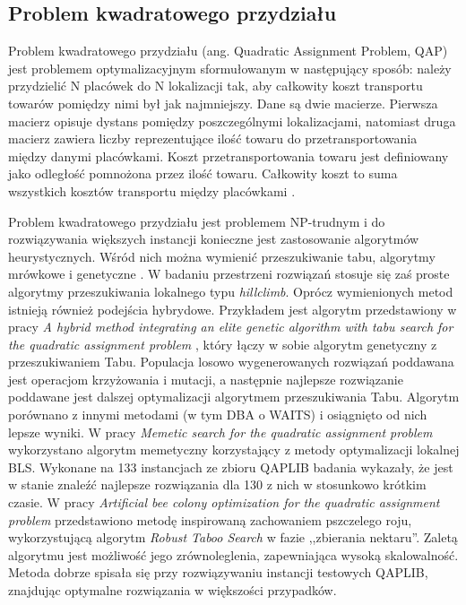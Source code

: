 \subsection{Problem kwadratowego przydziału}
Problem kwadratowego przydziału (ang. Quadratic Assignment Problem, QAP) jest problemem optymalizacyjnym sformułowanym w następujący sposób:
należy przydzielić N placówek do N lokalizacji tak, aby całkowity koszt transportu towarów pomiędzy nimi był jak najmniejszy.
Dane są dwie macierze. Pierwsza macierz opisuje dystans pomiędzy poszczególnymi lokalizacjami, natomiast druga macierz
zawiera liczby reprezentujące ilość towaru do przetransportowania między danymi placówkami.
Koszt przetransportowania towaru jest definiowany jako odległość pomnożona przez ilość towaru.
Całkowity koszt to suma wszystkich kosztów transportu między placówkami \cite{doi:10.1287/mnsc.9.4.586}.

Problem kwadratowego przydziału jest problemem NP-trudnym i do rozwiązywania większych instancji konieczne jest zastosowanie algorytmów
heurystycznych. Wśród nich można wymienić przeszukiwanie tabu, algorytmy mrówkowe i genetyczne \cite{DBLP:journals/concurrency/AcharyPPMGE21}.
W badaniu przestrzeni rozwiązań stosuje się zaś proste algorytmy przeszukiwania lokalnego typu \textit{hillclimb}.
Oprócz wymienionych metod istnieją również podejścia hybrydowe.
Przykładem jest algorytm przedstawiony w pracy \textit{A hybrid method integrating an elite genetic algorithm with tabu search for the quadratic assignment problem} \cite{DBLP:journals/isci/ZhangLZZ20},
który łączy w sobie algorytm genetyczny z przeszukiwaniem Tabu. Populacja losowo wygenerowanych rozwiązań
poddawana jest operacjom krzyżowania i mutacji, a następnie najlepsze rozwiązanie poddawane jest dalszej optymalizacji algorytmem przeszukiwania Tabu.
Algorytm porównano z innymi metodami (w tym DBA o WAITS) i osiągnięto od nich lepsze wyniki.
W pracy \textit{Memetic search for the quadratic assignment problem} \cite{DBLP:journals/eswa/BenlicH15} wykorzystano algorytm memetyczny korzystający z metody optymalizacji lokalnej
BLS. Wykonane na 133 instancjach ze zbioru QAPLIB badania wykazały, że jest w stanie znaleźć najlepsze rozwiązania dla 130 z nich w stosunkowo krótkim czasie.
W pracy \textit{Artificial bee colony optimization for the quadratic assignment problem} przedstawiono metodę inspirowaną zachowaniem pszczelego roju,
wykorzystującą algorytm \textit{Robust Taboo Search} w fazie ,,zbierania nektaru''. Zaletą algorytmu jest możliwość jego zrównoleglenia,
zapewniająca wysoką skalowalność. Metoda dobrze spisała się przy rozwiązywaniu instancji testowych QAPLIB, znajdując optymalne rozwiązania w większości przypadków.


